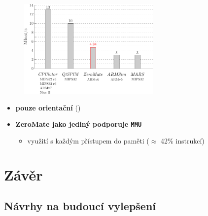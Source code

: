 \documentclass[compress]{beamer}
\begin{document}
\begin{frame}
	\vspace{-0.2cm}
	\begin{figure}
		\centering
		\includegraphics[width=0.62\textwidth]{img/performance_comparison.pdf}
	\end{figure}
	\vspace{-0.4cm}
	\noindent\makebox[\linewidth]{\rule{\textwidth}{0.4pt}}
	\vspace{-0.4cm}
	\begin{itemize}
		\item \textbf{pouze orientační} (\href{https://cpulator.01xz.net/}{})
		\item \textbf{ZeroMate jako jediný podporuje \texttt{MMU}}
		\begin{itemize}
			\item využití s každým přístupem do paměti ($\approx$ 42\% instrukcí)
		\end{itemize}
	\end{itemize}
\end{frame}

\section{Závěr}

\subsection{Návrhy na budoucí vylepšení}
\end{document}
